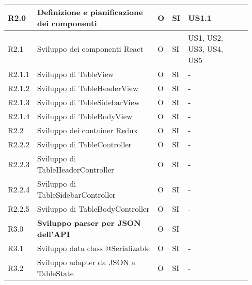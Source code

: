 \begin{longtable} {
		|>{}p{10mm}| 
		|>{}p{60mm}|
		|>{}p{15mm}|
		|>{}p{15mm}|
		|>{}p{15mm}|
		>{}p{0mm}}
	\hline
	R2.0   & \textbf{Definizione e pianificazione dei componenti} & O & SI & US1.1\\ \hline
	R2.1   & Sviluppo dei componenti React 		  & O & SI & US1, US2, US3, US4, US5 \\ \hline
	R2.1.1 & Sviluppo di TableView                & O & SI & -     \\ \hline
	R2.1.2 & Sviluppo di TableHeaderView          & O & SI & -     \\ \hline
	R2.1.3 & Sviluppo di TableSidebarView         & O & SI & -     \\ \hline
	R2.1.4 & Sviluppo di TableBodyView            & O & SI & -     \\ \hline
	R2.2   & Sviluppo dei container Redux         & O & SI & -     \\ \hline
	R2.2.2 & Sviluppo di TableController          & O & SI & -     \\ \hline
	R2.2.3 & Sviluppo di TableHeaderController    & O & SI & -     \\ \hline
	R2.2.4 & Sviluppo di TableSidebarController   & O & SI & -     \\ \hline
	R2.2.5 & Sviluppo di TableBodyController      & O & SI & -     \\ \hline
	\hline
	R3.0   & \textbf{Sviluppo parser per JSON dell'API}         & O & SI & -     \\ \hline
	R3.1   & Sviluppo data class @Serializable 	   & O & SI & -     \\ \hline
	R3.2   & Sviluppo adapter da JSON a TableState & O & SI & -     \\ \hline
	
	\hline
\end{longtable}